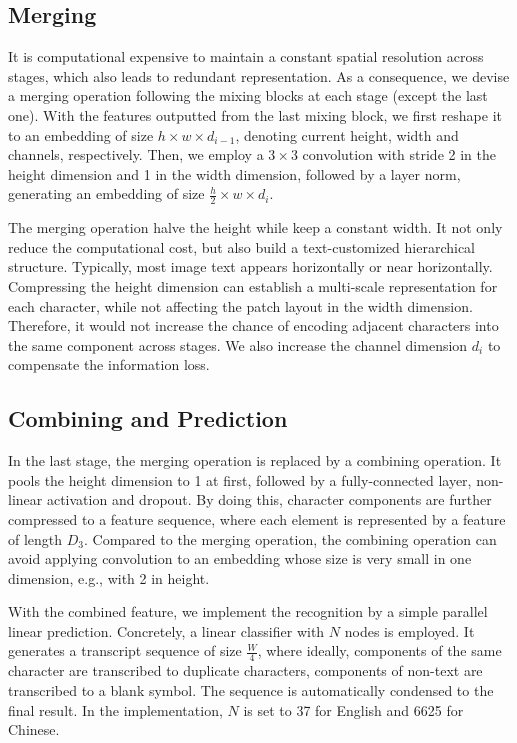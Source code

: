 \documentclass{article}
\begin{document}
\subsection{Merging}

It is computational expensive to maintain a constant spatial resolution 
across stages, which also leads to redundant representation. As a consequence, we devise a merging operation following the mixing blocks at each stage (except the last one). With the features outputted from the last mixing block, we first reshape it to an embedding of size $h \times  w \times  d_{i-1}$, denoting current height, width and channels, respectively. Then, we employ a $3 \times 3$ convolution with stride 2 in the height dimension and 1 in the width dimension, followed by a layer norm, generating an embedding of size $\frac{h}{2} \times  w \times  d_i$.

The merging operation halve the height while keep a constant width. It not only reduce the computational cost, but also build a text-customized hierarchical structure. Typically, most image text appears horizontally or near horizontally. Compressing the height dimension can establish a multi-scale representation for each character, while not affecting the patch layout in the width dimension. Therefore, it would not increase the chance of encoding adjacent characters into the same component across stages. We also increase the channel dimension $d_i$ to compensate the information loss.




\subsection{Combining and Prediction}
In the last stage, the merging operation is replaced by a combining operation. It pools the height dimension to 1 at first, followed by a fully-connected layer, non-linear activation and dropout. By doing this, character components are further compressed to a feature sequence, where each element is represented by a feature of length $D_3$. Compared to the merging operation, the combining operation can avoid applying convolution to an embedding whose size is very small in one dimension, e.g., with 2 in height.

With the combined feature, we implement the recognition by a simple parallel linear prediction. Concretely, a linear classifier with $N$ nodes is employed. It generates a transcript sequence of size $\frac{W}{4}$, where ideally, components of the same character are transcribed to duplicate characters, components of non-text are transcribed to a blank symbol. The sequence is automatically condensed to the final result. In the implementation, $N$ is set to 37 for English and 6625 for Chinese.
\end{document}
